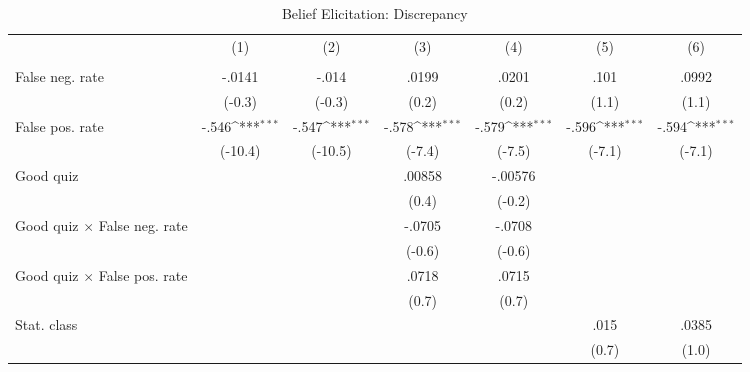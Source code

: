 \begin{table}[htbp]\centering
\def\sym#1{\ifmmode^{#1}\else\(^{#1}\)\fi}
\caption{Belief Elicitation: Discrepancy}
\begin{tabular}{l*{6}{c}}
\hline\hline
                &\multicolumn{1}{c}{(1)}&\multicolumn{1}{c}{(2)}&\multicolumn{1}{c}{(3)}&\multicolumn{1}{c}{(4)}&\multicolumn{1}{c}{(5)}&\multicolumn{1}{c}{(6)}\\
                &\multicolumn{1}{c}{}&\multicolumn{1}{c}{}&\multicolumn{1}{c}{}&\multicolumn{1}{c}{}&\multicolumn{1}{c}{}&\multicolumn{1}{c}{}\\
\hline
False neg. rate &   -.0141         &    -.014         &    .0199         &    .0201         &     .101         &    .0992         \\
                &   (-0.3)         &   (-0.3)         &    (0.2)         &    (0.2)         &    (1.1)         &    (1.1)         \\
False pos. rate &    -.546\sym{***}&    -.547\sym{***}&    -.578\sym{***}&    -.579\sym{***}&    -.596\sym{***}&    -.594\sym{***}\\
                &  (-10.4)         &  (-10.5)         &   (-7.4)         &   (-7.5)         &   (-7.1)         &   (-7.1)         \\
Good quiz       &                  &                  &   .00858         &  -.00576         &                  &                  \\
                &                  &                  &    (0.4)         &   (-0.2)         &                  &                  \\
Good quiz $\times$ False neg. rate&                  &                  &   -.0705         &   -.0708         &                  &                  \\
                &                  &                  &   (-0.6)         &   (-0.6)         &                  &                  \\
Good quiz $\times$ False pos. rate&                  &                  &    .0718         &    .0715         &                  &                  \\
                &                  &                  &    (0.7)         &    (0.7)         &                  &                  \\
Stat. class     &                  &                  &                  &                  &     .015         &    .0385         \\
                &                  &                  &                  &                  &    (0.7)         &    (1.0)         \\

\end{tabular}
\end{table}
